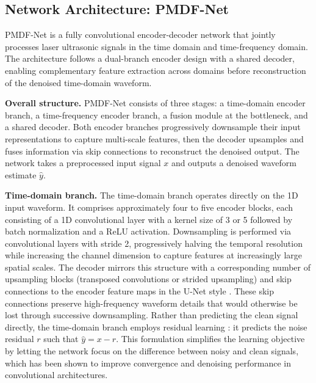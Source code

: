 \subsection{Network Architecture: PMDF-Net}
\label{sec:architecture}

PMDF-Net is a fully convolutional encoder-decoder network that jointly processes laser ultrasonic signals in the time domain and time-frequency domain. The architecture follows a dual-branch encoder design with a shared decoder, enabling complementary feature extraction across domains before reconstruction of the denoised time-domain waveform.

\textbf{Overall structure.} PMDF-Net consists of three stages: a time-domain encoder branch, a time-frequency encoder branch, a fusion module at the bottleneck, and a shared decoder. Both encoder branches progressively downsample their input representations to capture multi-scale features, then the decoder upsamples and fuses information via skip connections to reconstruct the denoised output. The network takes a preprocessed input signal $x$ and outputs a denoised waveform estimate $\hat{y}$.

\textbf{Time-domain branch.} The time-domain branch operates directly on the 1D input waveform. It comprises approximately four to five encoder blocks, each consisting of a 1D convolutional layer with a kernel size of 3 or 5 followed by batch normalization and a ReLU activation. Downsampling is performed via convolutional layers with stride 2, progressively halving the temporal resolution while increasing the channel dimension to capture features at increasingly large spatial scales. The decoder mirrors this structure with a corresponding number of upsampling blocks (transposed convolutions or strided upsampling) and skip connections to the encoder feature maps in the U-Net style \cite{ronneberger2015unet}. These skip connections preserve high-frequency waveform details that would otherwise be lost through successive downsampling. Rather than predicting the clean signal directly, the time-domain branch employs residual learning \cite{zhang2017denoising}: it predicts the noise residual $r$ such that $\hat{y} = x - r$. This formulation simplifies the learning objective by letting the network focus on the difference between noisy and clean signals, which has been shown to improve convergence and denoising performance in convolutional architectures.

